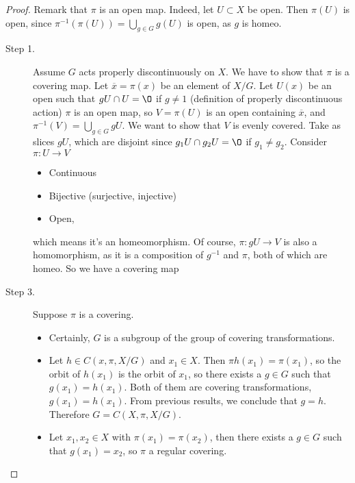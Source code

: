 \begin{proof}
    Remark that $\pi$ is an open map.
    Indeed, let $U \subset X$ be open.
    Then $\pi(U)$ is open, since $\pi^{-1}(\pi(U)) = \bigcup_{g \in G} g(U)$ is open, as $g$ is homeo.

    \begin{description}
        \item[Step 1.]
            Assume $G$ acts properly discontinuously on $X$.
            We have to show that $\pi$ is a covering map.
            Let $\overline{x} = \pi(x)$ be an element of $X / G$.
            Let $U(x)$ be an open such that $gU \cap U = \O$ if $g \neq 1$ (definition of properly discontinuous action)
            $\pi$ is an open map, so  $V = \pi(U)$ is an open containing  $\overline{x}$, and $\pi^{-1}(V) = \bigcup_{g \in G} gU$.
            We want to show that $V$ is evenly covered.
            Take as slices $gU$, which are disjoint since $g_1 U \cap  g_2 U = \O$ if $g_1 \neq g_2$.
            Consider $\pi : U \to V$
            \begin{itemize}
                \item Continuous
                \item Bijective (surjective, injective)
                \item Open,
            \end{itemize}
            which means it's an homeomorphism.
            Of course, $\pi: gU \to  V$ is also a homomorphism, as it is a composition of $g^{-1}$ and $\pi$, both of which are homeo. So we have a covering map
        \item[Step 3.]
            Suppose $\pi$ is a covering.
            \begin{itemize}
                \item Certainly, $G$ is a subgroup of the group of covering transformations.
                \item Let $h \in C( x, \pi, X /G)$ and $x_1 \in X$.
                    Then $\pi h(x_1) = \pi(x_1)$, so the orbit of $h(x_1)$ is the orbit of $x_1$, so there exists a $g \in G$ such that $g(x_1) = h(x_1)$.
                    Both of them are covering transformations, $g(x_1) = h(x_1)$.
                    From previous results, we conclude that $g = h$.
                    Therefore $G = C(X, \pi, X / G)$.
                \item Let $x_1, x_2 \in X$ with $\pi(x_1) = \pi(x_2)$, then there exists a $g \in G$ such that $g(x_1) = x_2$, so $\pi$ a regular covering.
            \end{itemize}



\end{description}
\end{proof}
